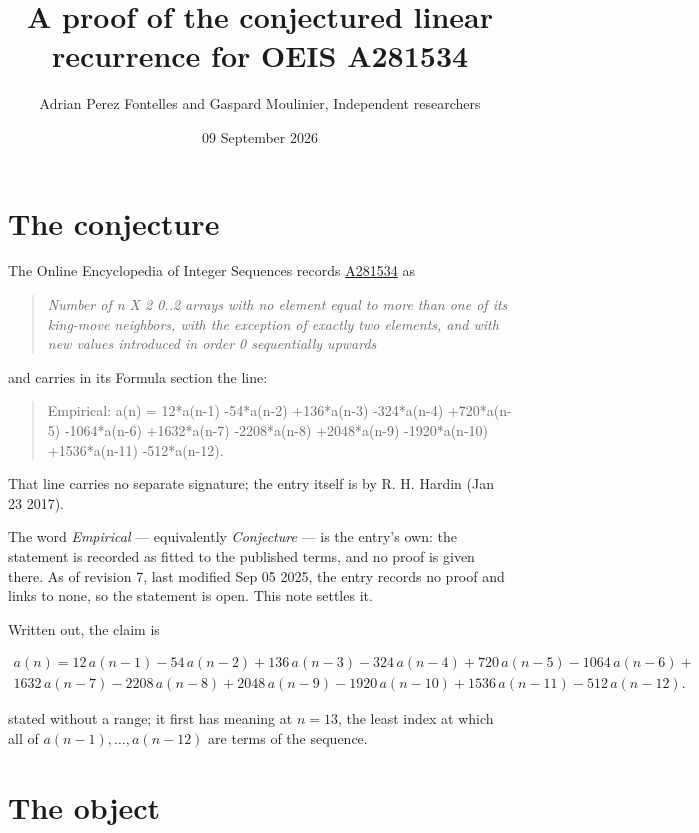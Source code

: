 \documentclass[11pt]{article}
\title{A proof of the conjectured linear recurrence for OEIS A281534}
\author{Adrian Perez Fontelles and Gaspard Moulinier, Independent researchers}
\date{09 September 2026}
\theoremstyle{definition}
\begin{document}
\maketitle
\section{The conjecture}

The Online Encyclopedia of Integer Sequences records \href{https://oeis.org/A281534}{A281534} as

\begin{quote}\itshape Number of n X 2 0..2 arrays with no element equal to more than one of its king-move neighbors, with the exception of exactly two elements, and with new values introduced in order 0 sequentially upwards\end{quote}

and carries in its Formula section the line:

\begin{quote}\ttfamily Empirical: a(n) = 12*a(n-1) -54*a(n-2) +136*a(n-3) -324*a(n-4) +720*a(n-5) -1064*a(n-6) +1632*a(n-7) -2208*a(n-8) +2048*a(n-9) -1920*a(n-10) +1536*a(n-11) -512*a(n-12).\end{quote}

That line carries no separate signature; the entry itself is by R. H. Hardin (Jan 23 2017).

The word {\itshape Empirical} --- equivalently {\itshape Conjecture} --- is the entry's own: the statement is recorded as fitted to the published terms, and no proof is given there. As of revision 7, last modified Sep 05 2025, the entry records no proof and links to none, so the statement is open. This note settles it.

Written out, the claim is

\begin{multline*} a(n) = 12\,a(n-1) - 54\,a(n-2) + 136\,a(n-3) - 324\,a(n-4) + 720\,a(n-5) - 1064\,a(n-6) + \\ 1632\,a(n-7) - 2208\,a(n-8) + 2048\,a(n-9) - 1920\,a(n-10) + 1536\,a(n-11) - 512\,a(n-12). \end{multline*}

stated without a range; it first has meaning at $n = 13$, the least index at which all of $a(n-1),\dots,a(n-12)$ are terms of the sequence.

\section{The object}
\end{document}
